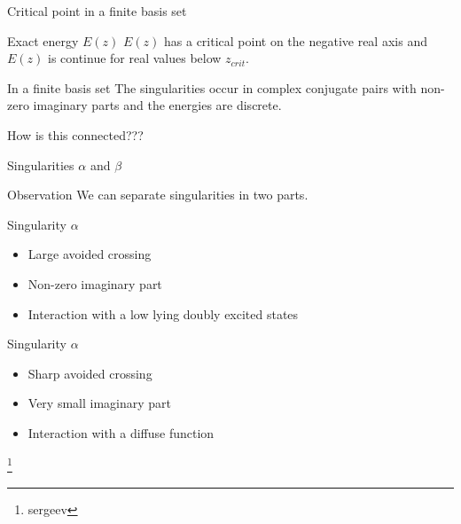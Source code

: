 \documentclass[xcolor=x11names,compress]{beamer}
\renewcommand{\(}{\begin{columns}}
\renewcommand{\)}{\end{columns}}
\newcommand{\<}[1]{\begin{column}{#1}}
\renewcommand{\>}{\end{column}}
\begin{document}
\begin{frame}{Critical point in a finite basis set}

\pause[1]
    
\begin{beamerboxesrounded}[scheme=foncé]{\centering Exact energy $E(z)$}
$E(z)$ has a critical point on the negative real axis and $E(z)$ is continue for real values below $z_{crit}$.
\end{beamerboxesrounded}

\vspace{0.5cm}

\pause[2]

\begin{beamerboxesrounded}[scheme=foncé]{\centering In a finite basis set}
The singularities occur in complex conjugate pairs with non-zero imaginary parts and the energies are discrete. 
\end{beamerboxesrounded}

\vspace{0.5cm}

\pause[3]

\centering \Large{How is this connected???}
    
\end{frame}

\begin{frame}{Singularities $\alpha$ and $\beta$}

\pause[1]

\begin{beamerboxesrounded}[scheme=foncé]{\centering Observation}
We can separate singularities in two parts. 
\end{beamerboxesrounded}   

\pause[2]

\begin{beamerboxesrounded}[scheme=foncé]{\centering Singularity $\alpha$}
\begin{itemize}
    \item Large avoided crossing
    \item Non-zero imaginary part
    \item Interaction with a low lying doubly excited states
\end{itemize} 
\end{beamerboxesrounded}  

\pause[3]

\begin{beamerboxesrounded}[scheme=foncé]{\centering Singularity $\alpha$}
\begin{itemize}
    \item Sharp avoided crossing
    \item Very small imaginary part
    \item Interaction with a diffuse function 
\end{itemize} 
\end{beamerboxesrounded} 

\footnote{sergeev}

\end{frame}
\end{document}
